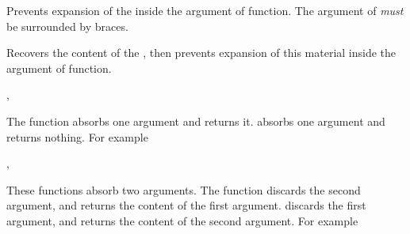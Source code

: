\documentclass[oneside]{book}
\let\tn=\cs
\begin{document}
\begin{function}{\ExpNot}
\begin{syntax}
 
\end{syntax}
Prevents expansion of the  inside the argument of  function.
The argument of  \emph{must} be surrounded by braces.
\end{function}

\begin{function}{\ExpValue}
\begin{syntax}
 
\end{syntax}
Recovers the content of the , then prevents expansion
of this material inside the argument of  function.
\end{function}

\begin{function}{\UseOne,\GobbleOne}
\begin{syntax}
 
 
\end{syntax}
The function  absorbs one argument and returns it.
 absorbs one argument and returns nothing.
For example
\begin{demohigh}
\end{demohigh}
\end{function}

\begin{function}{\UseGobble,\GobbleUse}
\begin{syntax}
  
  
\end{syntax}
These functions absorb two arguments.
The function  discards the second argument,
and returns the content of the first argument.
 discards the first argument,
and returns the content of the second argument.
For example
\begin{demohigh}
\end{demohigh}
\end{function}
\end{document}
